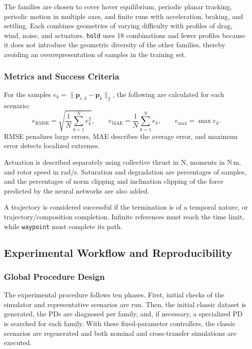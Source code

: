 The families are chosen to cover hover equilibrium, periodic planar tracking, periodic motion in multiple axes, and finite runs with acceleration, braking, and settling. Each combines geometries of varying difficulty with profiles of drag, wind, noise, and actuators. \texttt{hold} uses 18 combinations and fewer profiles because it does not introduce the geometric diversity of the other families, thereby avoiding an overrepresentation of samples in the training set.

\subsubsection*{Metrics and Success Criteria}
\label{subsubsec:metricas-criterios}

For the samples $e_k=\|\bm{p}_{r,k}-\bm{p}_k\|_2$, the following are calculated for each scenario:
\begin{equation}
 e_{\mathrm{RMSE}}=\sqrt{\frac{1}{N}\sum_{k=1}^{N} e_k^2},\qquad
 e_{\mathrm{MAE}}=\frac{1}{N}\sum_{k=1}^{N} e_k,\qquad
 e_{\max}=\max e_k.
\end{equation}
RMSE penalizes large errors, MAE describes the average error, and maximum error detects localized extremes.

Actuation is described separately using collective thrust in N, moments in N\,m, and rotor speed in rad/s. Saturation and degradation are percentages of samples, and the percentages of norm clipping and inclination clipping of the force predicted by the neural networks are also added.

A trajectory is considered successful if the termination is of a temporal nature, or trajectory/composition completion. Infinite references must reach the time limit, while \texttt{waypoint} must complete its path.

\subsection{Experimental Workflow and Reproducibility}
\label{subsec:flujo-reproducibilidad}

\subsubsection*{Global Procedure Design}

The experimental procedure follows ten phases. First, initial checks of the simulator and representative scenarios are run. Then, the initial classic dataset is generated, the PDs are diagnosed per family, and, if necessary, a specialized PD is searched for each family. With these fixed-parameter controllers, the classic scenarios are regenerated and both nominal and cross-transfer simulations are executed.

